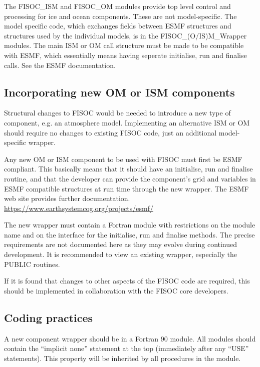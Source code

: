 \documentclass[11pt]{article}
\begin{document}
The FISOC\_ISM and FISOC\_OM modules provide top level control and processing for ice and ocean
components.
These are not model-specific.
The model specific code, which exchanges fields between 
ESMF structures and structures used by the individual models, is in the FISOC\_(O/IS)M\_Wrapper modules.
The main ISM or OM call structure must be made to be compatible with ESMF, which essentially means 
having seperate initialise, run and finalise calls.  See the ESMF documentation.





\subsection{Incorporating new OM or ISM components}

Structural changes to FISOC would be needed to introduce a new type 
of component, e.g. an atmosphere model.
Implementing an alternative ISM or OM should require no changes 
to existing FISOC code, just an additional model-specific wrapper.

Any new OM or ISM component to be used with FISOC must first be ESMF compliant.  This basically 
means that it should have an initialise, run and finalise routine, and that the developer can 
provide the component's grid and variables in ESMF compatible structures at run
time through the new wrapper.
The ESMF web site provides further documentation.
\url{https://www.earthsystemcog.org/projects/esmf/}


The new wrapper must contain a Fortran module with restrictions on the module name 
and on the  interface for the initialise, run and finalise methods. 
The precise requirements are not documented here as they may evolve 
during continued development.  
It is recommended to view an existing wrapper, especially the 
PUBLIC routines.

If it is found that changes to other aspects of the FISOC code are required, this should be 
implemented in collaboration with the FISOC core developers.





\subsection{Coding practices}

A new component wrapper  should be in a Fortran 90 module.  
All modules should contain the ``implicit none'' statement at the top (immediately after any 
``USE'' statements).  This property will be inherited by all procedures in the module.
\end{document}
